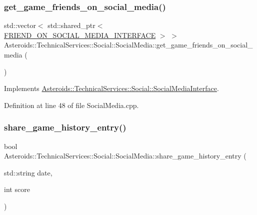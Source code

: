 \subsubsection{\texorpdfstring{get\+\_\+game\+\_\+friends\+\_\+on\+\_\+social\+\_\+media()}{get\_game\_friends\_on\_social\_media()}}
{\footnotesize\ttfamily std\+::vector$<$ std\+::shared\+\_\+ptr$<$ \hyperlink{classAsteroids_1_1TechnicalServices_1_1Social_1_1FRIEND__ON__SOCIAL__MEDIA__INTERFACE}{F\+R\+I\+E\+N\+D\+\_\+\+O\+N\+\_\+\+S\+O\+C\+I\+A\+L\+\_\+\+M\+E\+D\+I\+A\+\_\+\+I\+N\+T\+E\+R\+F\+A\+CE} $>$ $>$ Asteroids\+::\+Technical\+Services\+::\+Social\+::\+Social\+Media\+::get\+\_\+game\+\_\+friends\+\_\+on\+\_\+social\+\_\+media (\begin{DoxyParamCaption}{ }\end{DoxyParamCaption})\hspace{0.3cm}{\ttfamily [virtual]}}



Implements \hyperlink{classAsteroids_1_1TechnicalServices_1_1Social_1_1SocialMediaInterface_ad0e1bf4bcb33be433c445ac633e793d8}{Asteroids\+::\+Technical\+Services\+::\+Social\+::\+Social\+Media\+Interface}.



Definition at line 48 of file Social\+Media.\+cpp.

\mbox{\label{classAsteroids_1_1TechnicalServices_1_1Social_1_1SocialMedia_a0e9a33f41160db444c951015be441588}} 
\subsubsection{\texorpdfstring{share\+\_\+game\+\_\+history\+\_\+entry()}{share\_game\_history\_entry()}}
{\footnotesize\ttfamily bool Asteroids\+::\+Technical\+Services\+::\+Social\+::\+Social\+Media\+::share\+\_\+game\+\_\+history\+\_\+entry (\begin{DoxyParamCaption}\item[{std\+::string}]{date,  }\item[{int}]{score }\end{DoxyParamCaption})\hspace{0.3cm}{\ttfamily [virtual]}}

